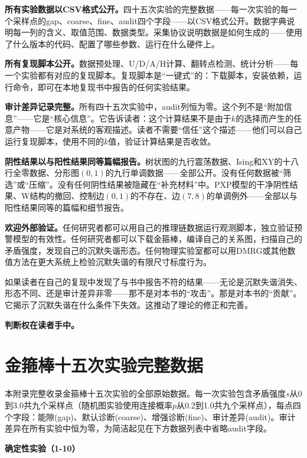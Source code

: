 \documentclass[11pt,a4paper]{book}
\theoremstyle{definition}
\begin{document}
\textbf{所有实验数据以CSV格式公开。}四十五次实验的完整数据——每一次实验的每一个采样点的gap、coarse、fine、audit四个字段——以CSV格式公开。数据字典说明每一列的含义、取值范围、数据类型。采集协议说明数据是如何生成的——使用了什么版本的代码、配置了哪些参数、运行在什么硬件上。

\textbf{所有复现脚本公开。}数据预处理、U/D/A/H计算、翻转点检测、统计分析——每一个实验都有对应的复现脚本。复现脚本是“一键式”的：下载脚本，安装依赖，运行命令，即可在本地复现书中报告的任何实验结果。

\textbf{审计差异记录完整。}所有四十五次实验中，audit列恒为零。这个列不是“附加信息”——它是“核心信息”。它告诉读者：这个计算结果不是由于$k$的选择而产生的任意产物——它是对系统的客观描述。读者不需要“信任”这个描述——他们可以自己运行复现脚本，使用不同的$k$值，验证计算结果是否收敛。

\textbf{阴性结果以与阳性结果同等篇幅报告。}树状图的九行震荡数据、Ising和XY的十八行全零数据、分形图$(0,1)$的九行单调数据——全部公开。没有任何数据被“筛选”或“压缩”。没有任何阴性结果被隐藏在“补充材料”中。PXP模型的干净阴性结果、W结构的撤回、控制边$(0,1)$的不存在、边$(7,8)$的单调例外——全部以与阳性结果同等的篇幅和细节报告。

\textbf{欢迎外部验证。}任何研究者都可以用自己的推理链数据运行观测脚本，独立验证预警模型的有效性。任何研究者都可以下载金箍棒，编译自己的关系图，扫描自己的矛盾强度，发现自己的沉默失谐形态。任何物理实验室都可以用DMRG或其他数值方法在更大系统上检验沉默失谐的有限尺寸标度行为。

如果读者在自己的复现中发现了与书中报告不符的结果——无论是沉默失谐消失、形态不同、还是审计差异非零——那不是对本书的“攻击”。那是对本书的“贡献”。它揭示了沉默失谐在什么条件下失效。这推动了理论的修正和完善。

\textbf{判断权在读者手中。}

\appendix

\chapter{金箍棒十五次实验完整数据}

本附录完整收录金箍棒十五次实验的全部原始数据。每一次实验包含矛盾强度$s$从0到3.0共九个采样点（随机图实验使用连接概率$p$从0.2到1.0共九个采样点），每点四个字段：能隙(gap)、默认诊断(coarse)、增强诊断(fine)、审计差异(audit)。审计差异在所有实验中恒为零，为简洁起见在下方数据列表中省略audit字段。

\textbf{确定性实验（1-10）}
\end{document}
